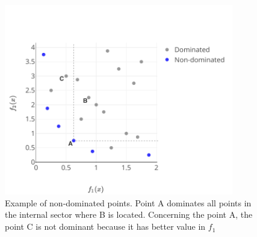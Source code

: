         \begin{figure}
            \centering 
            \includegraphics[width=10cm]{content/images/ndom}
            \caption[Non-dominated points]{Example of non-dominated points. Point A dominates all points in the internal sector where B is located. Concerning the point A, the point C is not dominant because it has better value in $f_1$} 
            \label{fig:dominated} 
        \end{figure}




